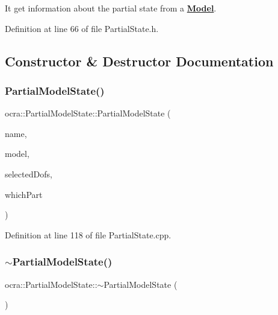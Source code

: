 It get information about the partial state from a {\bfseries \hyperlink{classocra_1_1Model}{Model}}. 

Definition at line 66 of file Partial\+State.\+h.



\subsection{Constructor \& Destructor Documentation}
\hypertarget{classocra_1_1PartialModelState_aad632d12d35f5982df12d949f92d4937}{}\label{classocra_1_1PartialModelState_aad632d12d35f5982df12d949f92d4937} 
\subsubsection{\texorpdfstring{Partial\+Model\+State()}{PartialModelState()}}
{\footnotesize\ttfamily ocra\+::\+Partial\+Model\+State\+::\+Partial\+Model\+State (\begin{DoxyParamCaption}\item[{const std\+::string \&}]{name,  }\item[{const \hyperlink{classocra_1_1Model}{Model} \&}]{model,  }\item[{const Eigen\+::\+Vector\+Xi \&}]{selected\+Dofs,  }\item[{int}]{which\+Part }\end{DoxyParamCaption})}



Definition at line 118 of file Partial\+State.\+cpp.

\hypertarget{classocra_1_1PartialModelState_a59cf8faac5922dc7691c540d519fa705}{}\label{classocra_1_1PartialModelState_a59cf8faac5922dc7691c540d519fa705} 
\subsubsection{\texorpdfstring{$\sim$\+Partial\+Model\+State()}{~PartialModelState()}}
{\footnotesize\ttfamily ocra\+::\+Partial\+Model\+State\+::$\sim$\+Partial\+Model\+State (\begin{DoxyParamCaption}{ }\end{DoxyParamCaption})\hspace{0.3cm}{\ttfamily [virtual]}}



